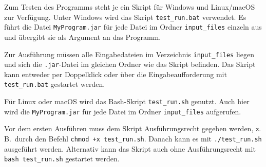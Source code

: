 Zum Testen des Programms steht je ein Skript für Windows und Linux/macOS zur Verfügung. Unter Windows wird das Skript \texttt{test\_run.bat} verwendet.
Es führt die Datei \texttt{MyProgram.jar} für jede Datei im Ordner \texttt{input\_files} einzeln aus und übergibt sie als Argument an das Programm.

Zur Ausführung müssen alle Eingabedateien im Verzeichnis \texttt{input\_files} liegen und sich die \texttt{.jar}-Datei im gleichen Ordner wie das Skript befinden.
Das Skript kann entweder per Doppelklick oder über die Eingabeaufforderung mit \texttt{test\_run.bat} gestartet werden.

Für Linux oder macOS wird das Bash-Skript \texttt{test\_run.sh} genutzt. Auch hier wird die \texttt{MyProgram.jar} für jede Datei im Ordner \texttt{input\_files} aufgerufen.

Vor dem ersten Ausführen muss dem Skript Ausführungsrecht gegeben werden, z.\,B.\ durch den Befehl \texttt{chmod +x test\_run.sh}. Danach kann es mit \texttt{./test\_run.sh} ausgeführt werden.
Alternativ kann das Skript auch ohne Ausführungsrecht mit \texttt{bash test\_run.sh} gestartet werden.